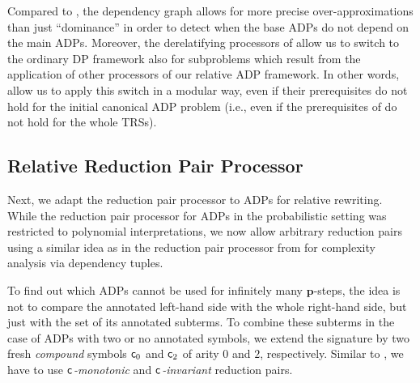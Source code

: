 Compared to
,
the dependency graph allows for more precise
over-approximations than just ``dominance'' in order
to detect when the base ADPs do not depend on 
the main ADPs.  Moreover,
the derelatifying processors of 
allow us to switch to  the ordinary DP framework also for subproblems which result 
from the application of other processors of our relative ADP framework.
In other words,  allow us to apply this
switch in a modular way, even if their prerequisites
do not hold for the initial canonical ADP problem (i.e., even if the prerequisites of 
do not hold for the whole TRSs).


\subsection{Relative Reduction Pair Processor}\label{Relative Reduction Pair Processor}

Next, we adapt the reduction pair processor to ADPs for relative rewriting.
While the reduction pair processor for ADPs in the probabilistic setting
\cite{FLOPS2024} was restricted to polynomial interpretations,
we now allow arbitrary
reduction pairs
using a similar idea as in 
the reduction pair processor from \cite{noschinski2013analyzing} for complexity analysis
via dependency tuples.

To find out which ADPs cannot be used for infinitely many $\mathbf{p}$-steps,
the idea is not to compare the annotated left-hand side with the
whole right-hand side, but just with the set of its annotated subterms.
To combine these subterms in the case of
ADPs with two or no annotated symbols, we extend the signature by two fresh \emph{compound} symbols
$\mathsf{c}_{0}$ and $\mathsf{c}_{2}$ of arity $0$ and $2$, respectively.
Similar to \cite{noschinski2013analyzing},
we have to use $\mathsf{c}_{}$\emph{-monotonic} and $\mathsf{c}_{}$\emph{-invariant} reduction pairs.

